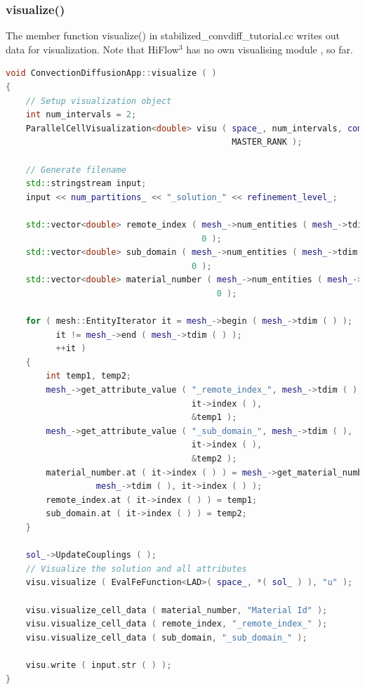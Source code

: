 \documentclass[a4paper, 11pt, twoside]{article}
\begin{document}
\subsubsection{visualize()}\label{sec:visualize}
The member function visualize() in stabilized\_convdiff\_tutorial.cc writes out data for visualization. Note that HiFlow$^3$ has no own visualising module  , so far.
\begin{lstlisting}[language=C++, basicstyle={\footnotesize, \ttfamily}, keywordstyle=\color{blue}, numbers=none, tabsize=4]
void ConvectionDiffusionApp::visualize ( )
{
    // Setup visualization object
    int num_intervals = 2;
    ParallelCellVisualization<double> visu ( space_, num_intervals, comm_, 
                                             MASTER_RANK );

    // Generate filename
    std::stringstream input;
    input << num_partitions_ << "_solution_" << refinement_level_;

    std::vector<double> remote_index ( mesh_->num_entities ( mesh_->tdim ( ) ), 
                                       0 );
    std::vector<double> sub_domain ( mesh_->num_entities ( mesh_->tdim ( ) ), 
                                     0 );
    std::vector<double> material_number ( mesh_->num_entities ( mesh_->tdim ( ) ), 
                                          0 );

    for ( mesh::EntityIterator it = mesh_->begin ( mesh_->tdim ( ) );
          it != mesh_->end ( mesh_->tdim ( ) );
          ++it )
    {
        int temp1, temp2;
        mesh_->get_attribute_value ( "_remote_index_", mesh_->tdim ( ),
                                     it->index ( ),
                                     &temp1 );
        mesh_->get_attribute_value ( "_sub_domain_", mesh_->tdim ( ),
                                     it->index ( ),
                                     &temp2 );
        material_number.at ( it->index ( ) ) = mesh_->get_material_number ( 
                  mesh_->tdim ( ), it->index ( ) );
        remote_index.at ( it->index ( ) ) = temp1;
        sub_domain.at ( it->index ( ) ) = temp2;
    }

    sol_->UpdateCouplings ( );
    // Visualize the solution and all attributes
    visu.visualize ( EvalFeFunction<LAD>( space_, *( sol_ ) ), "u" );

    visu.visualize_cell_data ( material_number, "Material Id" );
    visu.visualize_cell_data ( remote_index, "_remote_index_" );
    visu.visualize_cell_data ( sub_domain, "_sub_domain_" );

    visu.write ( input.str ( ) );
}
\end{lstlisting}
\end{document}
